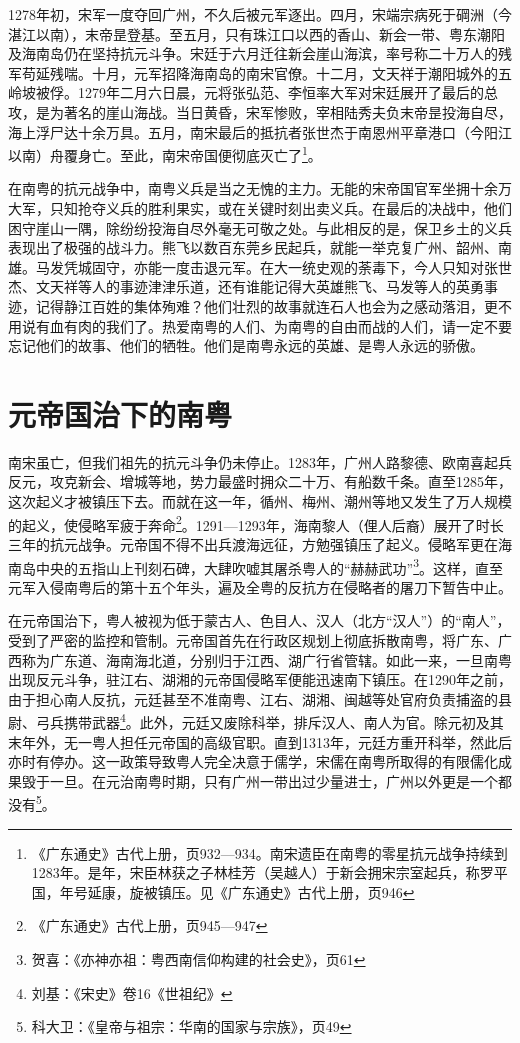 1278年初，宋军一度夺回广州，不久后被元军逐出。四月，宋端宗病死于碙洲（今湛江以南），末帝昰登基。至五月，只有珠江口以西的香山、新会一带、粤东潮阳及海南岛仍在坚持抗元斗争。宋廷于六月迁往新会崖山海滨，率号称二十万人的残军苟延残喘。十月，元军招降海南岛的南宋官僚。十二月，文天祥于潮阳城外的五岭坡被俘。1279年二月六日晨，元将张弘范、李恒率大军对宋廷展开了最后的总攻，是为著名的崖山海战。当日黄昏，宋军惨败，宰相陆秀夫负末帝昰投海自尽，海上浮尸达十余万具。五月，南宋最后的抵抗者张世杰于南恩州平章港口（今阳江以南）舟覆身亡。至此，南宋帝国便彻底灭亡了\footnote{《广东通史》古代上册，页932—934。南宋遗臣在南粤的零星抗元战争持续到1283年。是年，宋臣林获之子林桂芳（吴越人）于新会拥宋宗室起兵，称罗平国，年号延康，旋被镇压。见《广东通史》古代上册，页946}。

在南粤的抗元战争中，南粤义兵是当之无愧的主力。无能的宋帝国官军坐拥十余万大军，只知抢夺义兵的胜利果实，或在关键时刻出卖义兵。在最后的决战中，他们困守崖山一隅，除纷纷投海自尽外毫无可敬之处。与此相反的是，保卫乡土的义兵表现出了极强的战斗力。熊飞以数百东莞乡民起兵，就能一举克复广州、韶州、南雄。马发凭城固守，亦能一度击退元军。在大一统史观的荼毒下，今人只知对张世杰、文天祥等人的事迹津津乐道，还有谁能记得大英雄熊飞、马发等人的英勇事迹，记得静江百姓的集体殉难？他们壮烈的故事就连石人也会为之感动落泪，更不用说有血有肉的我们了。热爱南粤的人们、为南粤的自由而战的人们，请一定不要忘记他们的故事、他们的牺牲。他们是南粤永远的英雄、是粤人永远的骄傲。


\section{元帝国治下的南粤}


\indent 南宋虽亡，但我们祖先的抗元斗争仍未停止。1283年，广州人路黎德、欧南喜起兵反元，攻克新会、增城等地，势力最盛时拥众二十万、有船数千条。直至1285年，这次起义才被镇压下去。而就在这一年，循州、梅州、潮州等地又发生了万人规模的起义，使侵略军疲于奔命\footnote{《广东通史》古代上册，页945—947}。1291—1293年，海南黎人（俚人后裔）展开了时长三年的抗元战争。元帝国不得不出兵渡海远征，方勉强镇压了起义。侵略军更在海南岛中央的五指山上刊刻石碑，大肆吹嘘其屠杀粤人的“赫赫武功”\footnote{贺喜：《亦神亦祖：粤西南信仰构建的社会史》，页61}。这样，直至元军入侵南粤后的第十五个年头，遍及全粤的反抗方在侵略者的屠刀下暂告中止。

在元帝国治下，粤人被视为低于蒙古人、色目人、汉人（北方“汉人”）的“南人”，受到了严密的监控和管制。元帝国首先在行政区规划上彻底拆散南粤，将广东、广西称为广东道、海南海北道，分别归于江西、湖广行省管辖。如此一来，一旦南粤出现反元斗争，驻江右、湖湘的元帝国侵略军便能迅速南下镇压。在1290年之前，由于担心南人反抗，元廷甚至不准南粤、江右、湖湘、闽越等处官府负责捕盗的县尉、弓兵携带武器\footnote{刘基：《宋史》卷16《世祖纪》}。此外，元廷又废除科举，排斥汉人、南人为官。除元初及其末年外，无一粤人担任元帝国的高级官职。直到1313年，元廷方重开科举，然此后亦时有停办。这一政策导致粤人完全决意于儒学，宋儒在南粤所取得的有限儒化成果毁于一旦。在元治南粤时期，只有广州一带出过少量进士，广州以外更是一个都没有\footnote{科大卫：《皇帝与祖宗：华南的国家与宗族》，页49}。

